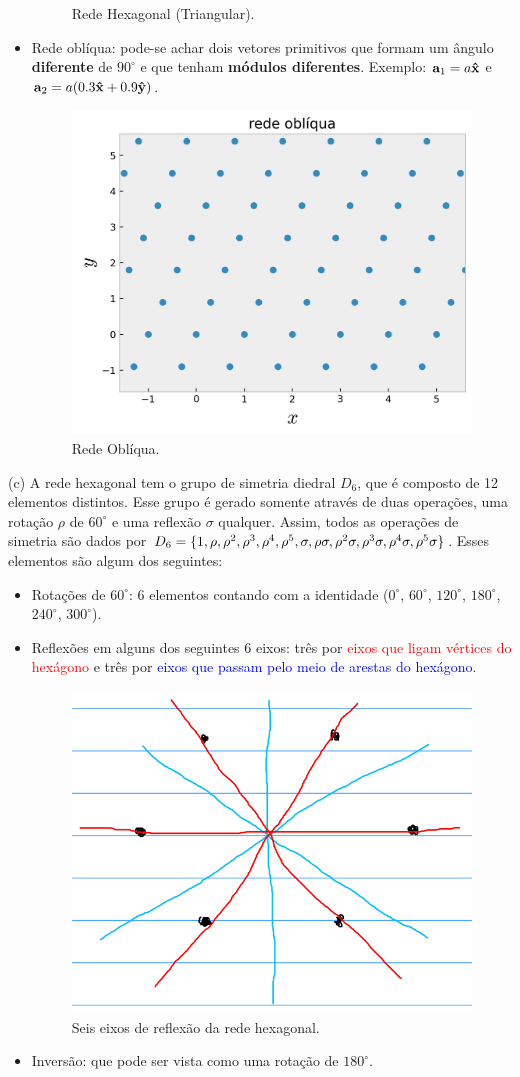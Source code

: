 \documentclass[a4paper,10pt]{article}
\begin{document}
\begin{itemize}
\begin{figure}[H]
\caption{Rede Hexagonal (Triangular).}
\label{fig:lat-triang}
\end{figure}
\item Rede oblíqua: pode-se achar dois vetores primitivos que formam um ângulo \textbf{diferente} de $90^\circ$ e que tenham \textbf{módulos diferentes}. Exemplo: $\vb{a}_1 = a \vu{x}$ e $\vb{a}_2 = a (0.3 \vu{x} + 0.9\vu{y})$.
\begin{figure}[H]
\centering
\includegraphics[width=0.35\linewidth]{fig/lattice_obliq.png}
\caption{Rede Oblíqua.}
\label{fig:lat-obliq}
\end{figure}
\end{itemize}

\n

(c) A rede hexagonal tem o grupo de simetria diedral $D_6$, que é composto de 12 elementos distintos. Esse grupo é gerado somente através de duas operações, uma rotação $\rho$ de $60^\circ$ e uma reflexão $\sigma$ qualquer. Assim, todos as operações de simetria são dados por $D_6 = \{1, \rho, \rho^2, \rho^3, \rho^4, \rho^5, \sigma, \rho\sigma, \rho^2\sigma, \rho^3\sigma, \rho^4\sigma, \rho^5\sigma\}$. Esses elementos são algum dos seguintes:
\begin{itemize}
\item Rotações de $60^\circ$: 6 elementos contando com a identidade ($0^\circ$, $60^\circ$, $120^\circ$, $180^\circ$, $240^\circ$, $300^\circ$).
\item Reflexões em alguns dos seguintes 6 eixos: três por \textcolor{red}{eixos que ligam vértices do hexágono} e três por \textcolor{blue}{eixos que passam pelo meio de arestas do hexágono}.
\begin{figure}[H]
\centering
\includegraphics[width=0.5\linewidth]{fig/hex_reflex.png}
\caption{Seis eixos de reflexão da rede hexagonal.}
\label{fig:hex_reflex}
\end{figure}
\item Inversão: que pode ser vista como uma rotação de $180^\circ$.
\end{itemize}
\end{document}

